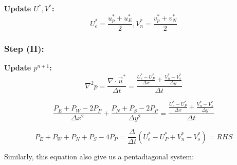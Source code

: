 \documentclass[12pt]{article}
\begin{document}

    
    

    




\textbf{Update $U^*, V^*$:}\\
    $$ U_e^* = \frac{u_p^*+u_E^*}{2} , V_n^* = \frac{v_p^*+v_N^*}{2}$$


\subsubsection{Step (II):}
\textbf{Update $p^{n+1}$:}\\

$$
    \nabla^2 p = \frac{\nabla \cdot \vec{u}^*}{\Delta t}= \frac{\frac{U_e^* - U_P^*}{\Delta x} + \frac{V_n^* - V_s^*}{\Delta y}}{\Delta t}
$$

$$
\frac{P_E + P_W - 2P_P}{\Delta x^2} + \frac{P_N + P_S - 2P_P}{\Delta y^2} = \frac{\frac{U_e^* - U_P^*}{\Delta x} + \frac{V_n^* - V_s^*}{\Delta y}}{\Delta t}
$$

$$
P_E + P_W + P_N + P_S - 4P_P = \frac{\Delta}{\Delta t} \left( U_e^* - U_P^* + V_n^* - V_s^* \right) = RHS
$$

Similarly, this equation also give us a pentadiagonal system:
\end{document}
